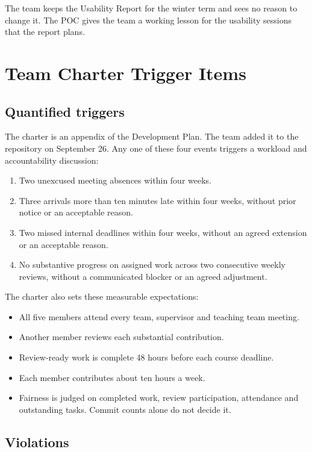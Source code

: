 \documentclass{article}
\begin{document}
The team keeps the Usability Report for the winter term and sees no reason
to change it. The POC gives the team a working lesson for the usability
sessions that the report plans.

\section{Team Charter Trigger Items}

\subsection*{Quantified triggers}

The charter is an appendix of the Development Plan. The team added it to the
repository on September 26. Any one of these four events triggers a workload
and accountability discussion:

\begin{enumerate}
    \item Two unexcused meeting absences within four weeks.
    \item Three arrivals more than ten minutes late within four weeks,
    without prior notice or an acceptable reason.
    \item Two missed internal deadlines within four weeks, without an agreed
    extension or an acceptable reason.
    \item No substantive progress on assigned work across two consecutive
    weekly reviews, without a communicated blocker or an agreed adjustment.
\end{enumerate}

The charter also sets these measurable expectations:

\begin{itemize}
    \item All five members attend every team, supervisor and teaching team
    meeting.
    \item Another member reviews each substantial contribution.
    \item Review-ready work is complete 48 hours before each course deadline.
    \item Each member contributes about ten hours a week.
    \item Fairness is judged on completed work, review participation,
    attendance and outstanding tasks. Commit counts alone do not decide it.
\end{itemize}

\subsection*{Violations}
\end{document}
